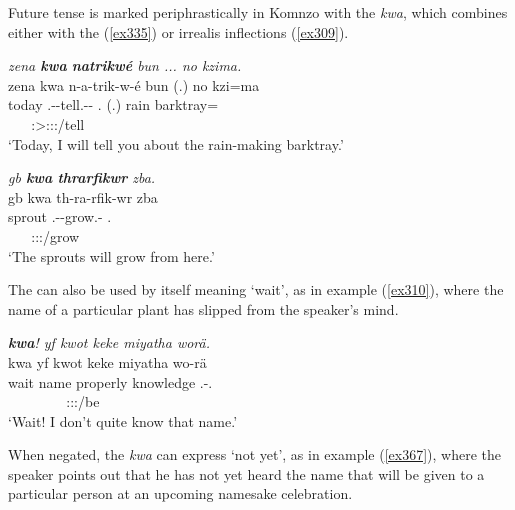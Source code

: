 Future tense is marked periphrastically in Komnzo with the  \emph{kwa}, which combines either with the  (\ref{ex335}) or irrealis inflections (\ref{ex309}).

\begin{exe}
 	\ex \emph{zena \textbf{kwa} \textbf{natrikwé} bun ... no kzima.}\\
 	\glll zena kwa n-a-trik-w-é bun (.) no kzi=ma\\
 	today {\Fut} \Ssg.\Alph-\Vc-tell.\Ext-\Ndu-\Fsg{} \Ssg.{\Dat} (.) rain barktray={\Char}\\
	~ ~ {\footnotesize \Fsg:\Sbj>\Ssg:\Io:\Nonpast:\Ipfv/tell} ~ ~ ~\\
 	\trans `Today, I will tell you about the rain-making barktray.' 
 	\label{ex335}
\end{exe}
\begin{exe}
 	\ex \emph{gb \textbf{kwa} \textbf{thrarfikwr} zba.}\\
 	\glll gb kwa th-ra-rfik-wr zba\\
 	sprout {\Fut} \Stnsg.\Bet-\Irr-grow.\Ext-{\Ndu} \Prox.\Abl\\
	~ ~ {\footnotesize \Stpl:\Sbj:\Irr:\Ipfv/grow} ~\\
 	\trans `The sprouts will grow from here.' 
 	\label{ex309}
\end{exe}

The   can also be used by itself meaning `wait', as in example (\ref{ex310}), where the name of a particular plant has slipped from the speaker's mind.

\begin{exe}
	\ex \emph{\textbf{kwa}! yf kwot keke miyatha worä.}\\
	\glll kwa yf kwot keke miyatha wo-rä\\
	wait name properly {\Neg} knowledge \Fsg.\Alph-\Cop.\Ndu\\
	~ ~ ~ ~ ~ {\footnotesize \Fsg:\Sbj:\Nonpast:\Ipfv/be}\\
	\trans `Wait! I don't quite know that name.' 
	\label{ex310}
\end{exe}

When negated, the   \emph{kwa} can express `not yet', as in example (\ref{ex367}), where the speaker points out that he has not yet heard the name that will be given to a particular person at an upcoming namesake celebration.

